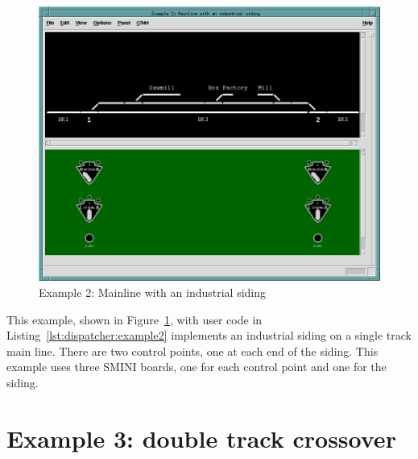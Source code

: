 \begin{figure}[hbpt]
\begin{centering}
\includegraphics[width=5in]{DISPExample2.png}
\caption{Example 2: Mainline with an industrial siding}
\label{fig:dispatcher:example2}
\end{centering}
\end{figure}


This example, shown in Figure~\ref{fig:dispatcher:example2}, with user
code in Listing~\ref{lst:dispatcher:example2} implements an industrial
siding on a single track main line.  There are two control points, one
at each end of the siding.  This example uses three SMINI boards, one
for each control point and one for the siding.

\section{Example 3: double track crossover}

